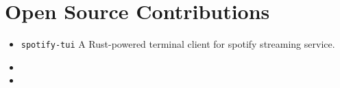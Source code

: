 \documentclass[letterpaper]{deedy-resume}
\begin{document}
\begin{minipage}[t]{0.66\textwidth}
    \vspace{3em}

    \section{Open Source Contributions}
    \begin{itemize}
        \item \verb|spotify-tui| \textendash{} A Rust-powered terminal client for spotify streaming service.
        \item
        \item
    \end{itemize}


\end{minipage} %

\end{document}

